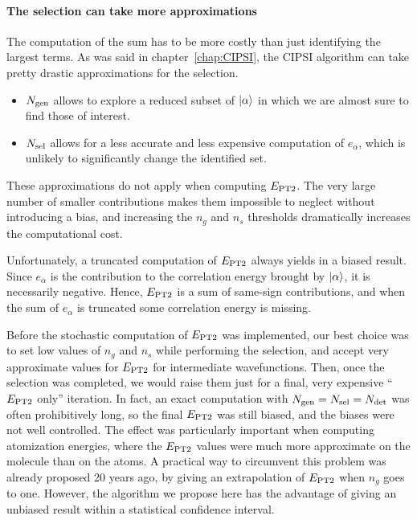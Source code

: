 \documentclass[./thesis.tex]{subfiles}
\begin{document}
\paragraph{The selection can take more approximations}
The computation of the sum has to be more costly than just identifying the largest terms. As was said in chapter~\ref{chap:CIPSI}, the CIPSI algorithm can take pretty drastic approximations for the selection.\cite{Evangelisti_1983}
	\begin{itemize}
		\item{${N_\text{gen}}$}
		allows to explore a reduced subset of $\ket \alpha$ in which we are almost sure to find those of interest.
		\item{${N_\text{sel}}$}
		allows for a less accurate and less expensive computation of $e_\alpha$, which is unlikely to significantly change the identified set.
	\end{itemize}
	These approximations do not apply when computing $E_\text{PT2}$. The very large number of smaller contributions makes them impossible to neglect without introducing a bias, and increasing the $n_g$ and $n_s$ thresholds dramatically increases the computational cost.


Unfortunately, a truncated computation of $E_\text{PT2}$ always yields in a biased result. Since $e_\alpha$ is the contribution to the correlation energy brought by ${\ket{\alpha}}$, it is necessarily negative. Hence, $E_\text{PT2}$ is a sum of same-sign contributions, and when the sum of $e_\alpha$ is truncated some correlation energy is missing.

Before the stochastic computation of $E_\text{PT2}$ was implemented, our best choice was to set low values of $n_g$ and $n_s$ while performing the selection, and accept very approximate values for $E_\text{PT2}$ for intermediate wavefunctions. Then, once the selection was completed, we would raise them just for a final, very expensive ``$E_\text{PT2}$ only'' iteration. In fact, an exact computation with ${N_\text{gen}}={N_\text{sel}}={N_\text{det}}$ was often prohibitively long, so the final $E_\text{PT2}$ was still biased, and the biases were not well controlled. The effect was particularly important when computing atomization energies, where the $E_\text{PT2}$ values were much more approximate on the molecule than on the atoms.
A practical way to circumvent this problem was already proposed 20 years ago, by giving an extrapolation of $E_\text{PT2}$ when $n_g$ goes to one.\cite{Angeli_1997} However, the algorithm we propose here has the advantage of giving an unbiased result within a statistical confidence interval.
\end{document}
